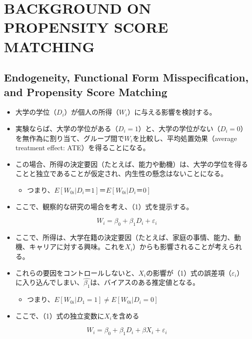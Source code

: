 \section{BACKGROUND ON PROPENSITY SCORE MATCHING}

\subsection*{Endogeneity, Functional Form Misspecification, and Propensity Score Matching}

\begin{itemize}
 \item 大学の学位（$D_i$）が個人の所得（$W_i$）に与える影響を検討する。
 \item 実験ならば、大学の学位がある（$D_i=1$）と、大学の学位がない（$D_i=0$）を無作為に割り当て、グループ間で$W_i$を比較し、平均処置効果（average treatment effect: ATE）を得ることになる。
 \item この場合、所得の決定要因（たとえば、能力や動機）は、大学の学位を得ることと独立であることが仮定され、内生性の懸念はないことになる。
  \begin{itemize}
   \item つまり、$E[W_{0i} | D_i＝1]＝E[W_{0i} | D_{i}＝0]$
  \end{itemize}
 \item ここで、観察的な研究の場合を考え、（1）式を提示する。
\end{itemize}

\begin{equation}
W_i = \beta_0 + \beta_1 D_i + \varepsilon_i
\end{equation}

\begin{itemize}
 \item ここで、所得は、大学在籍の決定要因（たとえば、家庭の事情、能力、動機、キャリアに対する興味。これを$X_i$）からも影響されることが考えられる。
 \item これらの要因をコントロールしないと、$X_i$の影響が（1）式の誤差項（$\varepsilon_i$）に入り込んでしまい、$\hat{\beta_1}$は、バイアスのある推定値となる。
  \begin{itemize}
   \item つまり、$E[W_{0i} | D_1=1] \neq E[W_{0i} | D_i=0]$
  \end{itemize}
 \item ここで、（1）式の独立変数に$X_i$を含める
\end{itemize}

\begin{equation}
W_i = \beta_0 + \beta_1 D_i + \beta X_i + \varepsilon_i
\end{equation}

